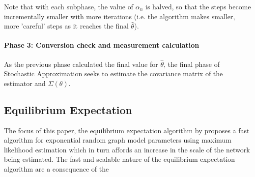 Note that with each subphase, the value of $\alpha_n$ is halved, so that the steps become incrementally smaller with more iterations (i.e. the algorithm makes smaller, more 'careful' steps as it reaches the final $\hat{\theta}$).

\paragraph{Phase 3: Conversion check and measurement calculation}

As the previous phase calculated the final value for $\hat{\theta}$, the final phase of Stochastic Approximation seeks to estimate the covariance matrix of the estimator and $\Sigma(\theta)$. 


\subsection{Equilibrium Expectation}

The focus of this paper, the equilibrium expectation algorithm by \cite{eqexpectation} proposes a fast algorithm for exponential random graph model parameters using maximum likelihood estimation which in turn affords an increase in the scale of the network being estimated. The fast and scalable nature of the equilibrium expectation algorithm are a consequence of the 

